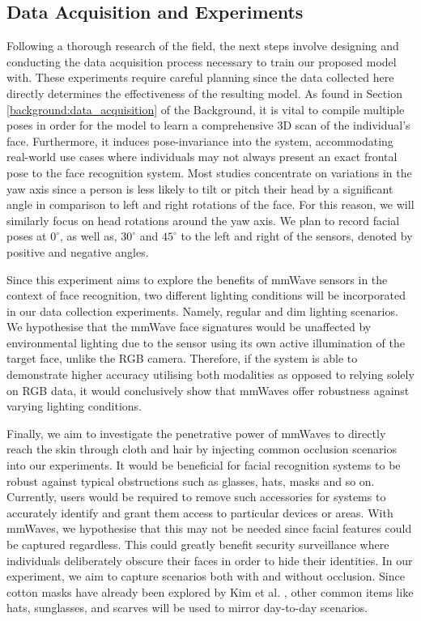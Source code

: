 \documentclass{interim}
\begin{document}
\subsection{Data Acquisition and Experiments}
\label{approach:data_acquisition}
Following a thorough research of the field, the next steps involve designing and conducting the data acquisition process necessary to train our proposed model with. These experiments require careful planning since the data collected here directly determines the effectiveness of the resulting model. As found in Section \ref{background:data_acquisition} of the Background, it is vital to compile multiple poses in order for the model to learn a comprehensive 3D scan of the individual's face. Furthermore, it induces pose-invariance into the system, accommodating real-world use cases where individuals may not always present an exact frontal pose to the face recognition system. Most studies concentrate on variations in the yaw axis since a person is less likely to tilt or pitch their head by a significant angle in comparison to left and right rotations of the face. For this reason, we will similarly focus on head rotations around the yaw axis. We plan to record facial poses at $0^\circ$, as well as, $30^\circ$ and $45^\circ$ to the left and right of the sensors, denoted by positive and negative angles. 

Since this experiment aims to explore the benefits of mmWave sensors in the context of face recognition, two different lighting conditions will be incorporated in our data collection experiments. Namely, regular and dim lighting scenarios. We hypothesise that the mmWave face signatures would be unaffected by environmental lighting due to the sensor using its own active illumination of the target face, unlike the RGB camera. Therefore, if the system is able to demonstrate higher accuracy utilising both modalities as opposed to relying solely on RGB data, it would conclusively show that mmWaves offer robustness against varying lighting conditions.

Finally, we aim to investigate the penetrative power of mmWaves to directly reach the skin through cloth and hair by injecting common occlusion scenarios into our experiments. It would be beneficial for facial recognition systems to be robust against typical obstructions such as glasses, hats, masks and so on. Currently, users would be required to remove such accessories for systems to accurately identify and grant them access to particular devices or areas. With mmWaves, we hypothesise that this may not be needed since facial features could be captured regardless. This could greatly benefit security surveillance where individuals deliberately obscure their faces in order to hide their identities. In our experiment, we aim to capture scenarios both with and without occlusion. Since cotton masks have already been explored by Kim et al. \cite{kim2020face}, other common items like hats, sunglasses, and scarves will be used to mirror day-to-day scenarios.
\end{document}
